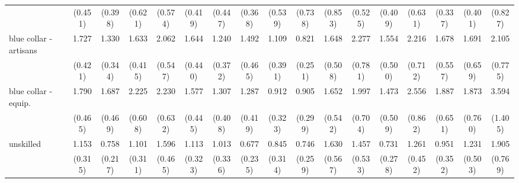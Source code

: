 {\begin{tabular}{l*{16}{c}}
                    &     (0.451)         &     (0.398)         &     (0.621)         &     (0.574)         &     (0.419)         &     (0.447)         &     (0.368)         &     (0.539)         &     (0.738)         &     (0.853)         &     (0.525)         &     (0.409)         &     (0.631)         &     (0.337)         &     (0.401)         &     (0.827)         \\
[1em]
blue collar - artisans&       1.727\sym{*}  &       1.330         &       1.633         &       2.062\sym{**} &       1.644         &       1.240         &       1.492         &       1.109         &       0.821         &       1.648         &       2.277\sym{*}  &       1.554         &       2.216\sym{*}  &       1.678         &       1.691         &       2.105\sym{*}  \\
                    &     (0.421)         &     (0.344)         &     (0.415)         &     (0.547)         &     (0.440)         &     (0.372)         &     (0.465)         &     (0.391)         &     (0.251)         &     (0.508)         &     (0.781)         &     (0.500)         &     (0.712)         &     (0.557)         &     (0.659)         &     (0.775)         \\
[1em]
blue collar - equip.&       1.790\sym{*}  &       1.687         &       2.225\sym{**} &       2.230\sym{**} &       1.577         &       1.307         &       1.287         &       0.912         &       0.905         &       1.652         &       1.997\sym{*}  &       1.473         &       2.556\sym{**} &       1.887         &       1.873         &       3.594\sym{**} \\
                    &     (0.465)         &     (0.469)         &     (0.608)         &     (0.632)         &     (0.445)         &     (0.408)         &     (0.419)         &     (0.323)         &     (0.299)         &     (0.542)         &     (0.704)         &     (0.509)         &     (0.862)         &     (0.651)         &     (0.760)         &     (1.405)         \\
[1em]
unskilled           &       1.153         &       0.758         &       1.101         &       1.596         &       1.113         &       1.013         &       0.677         &       0.845         &       0.746         &       1.630         &       1.457         &       0.731         &       1.261         &       0.951         &       1.231         &       1.905         \\
                    &     (0.315)         &     (0.217)         &     (0.311)         &     (0.465)         &     (0.323)         &     (0.336)         &     (0.235)         &     (0.314)         &     (0.259)         &     (0.567)         &     (0.533)         &     (0.278)         &     (0.452)         &     (0.352)         &     (0.503)         &     (0.769)         \\

\end{tabular}}
